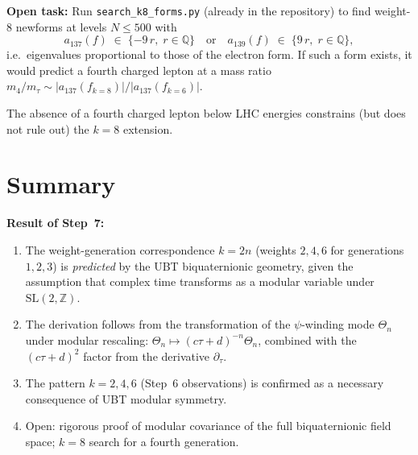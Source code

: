 \documentclass[12pt,a4paper]{article}
\theoremstyle{definition}
\theoremstyle{remark}
\begin{document}
\begin{gapbox}
\textbf{Open task:} Run \texttt{search\_k8\_forms.py} (already in the
repository) to find weight-8 newforms at levels $N \leq 500$ with
\begin{equation}
  a_{137}(f) \;\in\; \{-9\,r,\; r \in \mathbb{Q}\}
  \quad\text{or}\quad
  a_{139}(f) \;\in\; \{9\,r,\; r \in \mathbb{Q}\},
\end{equation}
i.e.\ eigenvalues proportional to those of the electron form.  If such a form
exists, it would predict a fourth charged lepton at a mass ratio
$m_{4}/m_\tau \sim |a_{137}(f_{k=8})| / |a_{137}(f_{k=6})|$.

The absence of a fourth charged lepton below LHC energies constrains (but does
not rule out) the $k = 8$ extension.
\end{gapbox}

\section{Summary}
\label{sec:summary}

\begin{resultbox}
\textbf{Result of Step~7:}
\begin{enumerate}
  \item The weight-generation correspondence $k = 2n$ (weights $2, 4, 6$ for
        generations $1, 2, 3$) is \emph{predicted} by the UBT biquaternionic
        geometry, given the assumption that complex time transforms as a modular
        variable under $\mathrm{SL}(2,\mathbb{Z})$.
  \item The derivation follows from the transformation of the $\psi$-winding
        mode $\Theta_n$ under modular rescaling: $\Theta_n \mapsto
        (c\tau+d)^{-n}\Theta_n$, combined with the $(c\tau+d)^2$ factor from
        the derivative $\partial_\tau$.
  \item The pattern $k = 2, 4, 6$ (Step~6 observations) is confirmed as a
        necessary consequence of UBT modular symmetry.
  \item Open: rigorous proof of modular covariance of the full biquaternionic
        field space; $k = 8$ search for a fourth generation.
\end{enumerate}
\end{resultbox}

\ifdefined\INCLUDEMODE
\else
  
\end{document}
